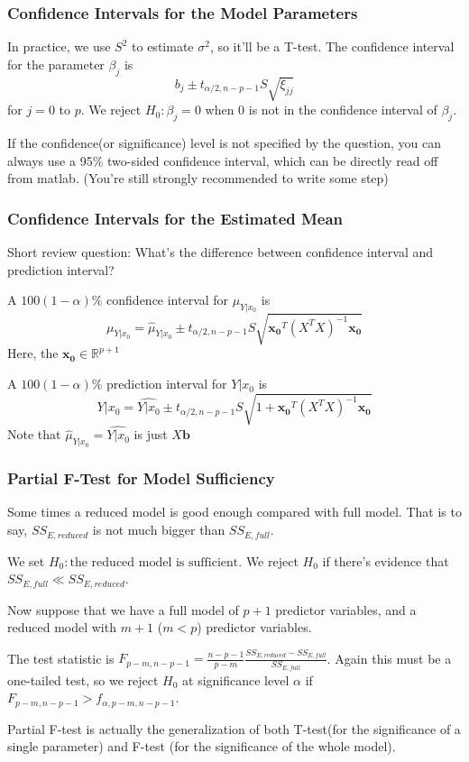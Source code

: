 \documentclass{beamer}
\begin{document}
\begin{frame}
    \frametitle{Confidence Intervals for the Model Parameters}

    In practice, we use $S^2$ to estimate $\sigma^2$, so it'll be a T-test. The confidence interval for the parameter $\beta_j$ is
    \[b_j\pm t_{\alpha/2, n-p-1}S\sqrt{\xi_{jj}}\]
    for $j=0$ to $p$.
    We reject $H_0: \beta_j=0$ when 0 is not in the confidence interval of $\beta_j$.\par
    If the confidence(or significance) level is not specified by the question, you can always use a 95\% two-sided confidence interval, which can be directly read off from matlab. (You're still strongly recommended to write some step)

\end{frame}

\begin{frame}
    \frametitle{Confidence Intervals for the Estimated Mean}

    Short review question: What's the difference between confidence interval and prediction interval?\par
    \vspace{0.3cm}

    A $100(1-\alpha)\%$ confidence interval for $\mu_{Y|x_0}$ is 
    \[\mu_{Y|x_0}=\hat{\mu}_{Y|x_0}\pm t_{\alpha/2, n-p-1} S \sqrt{\mathbf{x_0}^{T}(X^{T}X)^{-1}\mathbf{x_0}}\]
    Here, the $\mathbf{x_0}\in \mathbb{R}^{p+1}$\par

    A $100(1-\alpha)\%$ prediction interval for $Y|x_0$ is 
    \[Y|x_0=\widehat{Y|x_0}\pm t_{\alpha/2, n-p-1} S \sqrt{1+\mathbf{x_0}^{T}(X^{T}X)^{-1}\mathbf{x_0}}\]
    Note that $\hat{\mu}_{Y|x_0}=\widehat{Y|x_0}$ is just $X\mathbf{b}$

\end{frame}

\begin{frame}
    \frametitle{Partial F-Test for Model Sufficiency}

    Some times a reduced model is good enough compared with full model. That is to say, $SS_{E,reduced}$ is not much bigger than $SS_{E, full}$.\par
    We set $H_0: \text{the reduced model is sufficient}$. We reject $H_0$ if there's evidence that $SS_{E,full}\ll SS_{E,reduced}$.\par
    \vspace{0.3cm}
    Now suppose that we have a full model of $p+1$ predictor variables, and a reduced model with $m+1$ ($m<p$) predictor variables.\par
    \vspace{0.3cm}
    The test statistic is $F_{p-m,n-p-1}=\frac{n-p-1}{p-m}\frac{SS_{E,reduced}-SS_{E,full}}{SS_{E,full}}$. Again this must be a one-tailed test, so we reject $H_0$ at significance level $\alpha$ if $F_{p-m,n-p-1}>f_{\alpha,p-m,n-p-1}$.\par
    \vspace{0.3cm}
    Partial F-test is actually the generalization of both T-test(for the significance of a single parameter) and F-test (for the significance of the whole model).

\end{frame}
\end{document}
